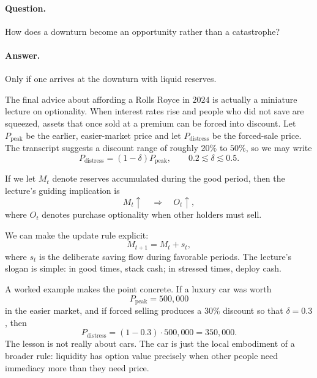 \paragraph{Question.} How does a downturn become an opportunity rather than a catastrophe?

\paragraph{Answer.} Only if one arrives at the downturn with liquid reserves.

The final advice about affording a Rolls Royce in \(2024\) is actually a miniature lecture on optionality. When interest rates rise and people who did not save are squeezed, assets that once sold at a premium can be forced into discount. Let \(P_{\mathrm{peak}}\) be the earlier, easier-market price and let \(P_{\mathrm{distress}}\) be the forced-sale price. The transcript suggests a discount range of roughly \(20\%\) to \(50\%\), so we may write
\begin{equation}
P_{\mathrm{distress}} = (1-\delta)P_{\mathrm{peak}},
\qquad
0.2 \lesssim \delta \lesssim 0.5.
\end{equation}

If we let \(M_t\) denote reserves accumulated during the good period, then the lecture's guiding implication is
\begin{equation}
M_t \uparrow \quad \Longrightarrow \quad O_t \uparrow,
\end{equation}
where \(O_t\) denotes purchase optionality when other holders must sell.

We can make the update rule explicit:
\begin{equation}
M_{t+1} = M_t + s_t,
\end{equation}
where \(s_t\) is the deliberate saving flow during favorable periods. The lecture's slogan is simple: in good times, stack cash; in stressed times, deploy cash.

A worked example makes the point concrete. If a luxury car was worth
\[
P_{\mathrm{peak}} = 500{,}000
\]
in the easier market, and if forced selling produces a \(30\%\) discount so that \(\delta=0.3\), then
\begin{equation}
P_{\mathrm{distress}} = (1-0.3)\cdot 500{,}000 = 350{,}000.
\end{equation}
The lesson is not really about cars. The car is just the local embodiment of a broader rule: liquidity has option value precisely when other people need immediacy more than they need price.

